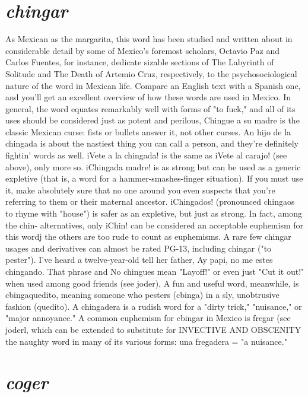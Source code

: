 \section{\emph{chingar}}

As Mexican as the margarita, this word has been studied and
written about in considerable detail by some of Mexico's foremost
scholars, Octavio Paz and Carlos Fuentes, for instance, dedicate sizable
sections of The Labyrinth of Solitude and The Death of Artemio Cruz,
respectively, to the psychosociological nature of the word in Mexican
life. Compare an English text with a Spanish one, and you'll get an excellent overview of how these words are used in Mexico.
In general, the word equates remarkably well with forms of "to
fuck," and all of its uses should be considered just as potent and perilous, Chingue a su madre is the classic Mexican curse: fists or bullets
answer it, not other curses. An hijo de la chingada is about the nastiest thing you can call a person, and they're definitely fightin' words as
well. iVete a la chingada! is the same as iVete al carajo! (see above),
only more so. iChingada madre! is as strong but can be used as a generic expletive (that is, a word for a hammer-smashes-finger situation).
If you must use it, make absolutely sure that no one around you even
suspects that you're referring to them or their maternal ancestor. iChingados! (pronounced chingaos to rhyme with "house") is safer as an expletive, but just as strong. In fact, among the chin- alternatives, only
iChin! can be considered an acceptable euphemism for this wordj the
others are too rude to count as euphemisms.
A rare few chingar usages and derivatives can almost be rated
PG-13, including chingar ("to pester"). I've heard a twelve-year-old tell
her father, Ay papi, no me estes chingando. That phrase and No chingues mean "Layoff!" or even just "Cut it out!" when used among good
friends (see joder), A fun and useful word, meanwhile, is cbingaquedito, meaning someone who pesters (cbinga) in a sly, unobtrusive fashion (quedito). A chingadera is a rudish word for a "dirty trick," "nuisance," or "major annoyance." A common euphemism for cbingar in
Mexico is fregar (see joderl, which can be extended to substitute for
INVECTIVE AND OBSCENITY
the naughty word in many of its various forms: una fregadera = "a
nuisance."

\section{\emph{coger}}

